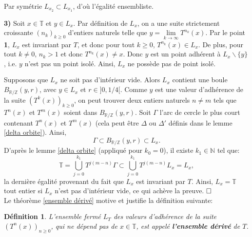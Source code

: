 \documentclass[11pt,a4 paper]{article}
\newtheorem{definition}[theoreme]{Définition}
\newcommand{\Tbb}{\mathbb{T}}
\newcommand{\Rbb}{\mathbb{R}}
\newcommand{\Zbb}{\mathbb{Z}}
\newenvironment{defi}{\begin{box_defi}\begin{definition}}{\end{definition}\end{box_defi}}
\begin{document}
	\par Par symétrie $L_{x_2}\subset L_{x_1}$, d'où l'égalité ensembliste.\\
	
	\par \textbf{3)} Soit $x\in \Tbb$ et $y \in L_x$. Par définition de $L_x$, on a une suite strictement croissante $(n_k)_{k\geq0}$ d'entiers naturels telle que $y=\underset{k \to \infty}{\lim}T^{n_k}(x)$. Par le point \textbf{1}, $L_x$ est invariant par $T$, et donc pour tout $k\geq0$, $T^{n_k}(x) \in L_x$. De plus, pour tout $k\neq 0$, $n_k >1$ et donc $T^{n_k}(x)\neq x$. Donc $y$ est un point adhérent à $L_x\backslash\lbrace y \rbrace$, i.e. $y$ n'est pas un point isolé. Ainsi, $L_x$ ne possède pas de point isolé.\\
	\par Supposons que $L_x$ ne soit pas d'intérieur vide. Alors $L_x$ contient une boule $B_{\Rbb/\Zbb}(y,r)$, avec $y\in L_x$ et $r\in ]0,1/4[$. Comme $y$ est une valeur d'adhérence de la suite $(T^k(x))_{k\geq0}$, on peut trouver deux entiers naturels $n\neq m$ tels que $T^n(x)$ et $T^m(x)$ soient dans $B_{\Rbb/\Zbb}(y,r)$. Soit $\Gamma$ l'arc de cercle le plus court contenant $T^n(x)$ et $T^m(x)$ (cela peut être $\Delta$ ou $\Delta'$ définis dans le lemme \ref{delta orbite}). Ainsi,
	 $$\Gamma \subset B_{\Rbb/\Zbb}(y,r) \subset L_x.$$
	  D'après le lemme \ref{delta orbite} (appliqué pour $k_0=0$), il existe $k_1 \in \mathbb{N}$ tel que:
	$$\Tbb=\overset{k_1}{\underset{j=0}{\bigcup}}T^{j(m-n)}\Gamma
			\subset \overset{k_1}{\underset{j=0}{\bigcup}}T^{j(m-n)} L_x = L_x,$$
	la dernière égalité provenant du fait que $L_x$ est invariant par $T$. Ainsi, $L_x = \Tbb$ tout entier si $L_x$ n'est pas d'intérieur vide, ce qui achève la preuve.	$\hfill \square$\\













Le théorème \ref{ensemble dérivé} motive et justifie la définition suivante:

\begin{defi}
	L'ensemble fermé $L_T$ des valeurs d'adhérence de la suite $(T^n(x))_{n\geq 0}$, qui ne dépend pas de $x \in \Tbb$, est appelé \textbf{l'ensemble dérivé} de $T$.
\end{defi}
\end{document}
